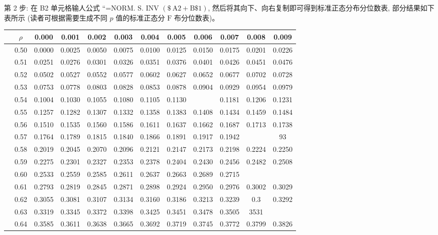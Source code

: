 \documentclass[10pt]{article}
\begin{document}
\begin{CJK*}{UTF8}{bsmi}
第 2 步: 在 B2 单元格输人公式 “=NORM. S. INV $(\$ \mathrm{~A} 2+\mathrm{B} \$ 1)$, 然后将其向下、向右复制即可得到标准正态分布分位数表, 部分结果如下表所示 (读者可根据需要生成不同 $p$ 值的标准正态分 $\mathrm{F}$ 布分位数表)。

\begin{center}
\begin{tabular}{|c|c|c|c|c|c|c|c|c|c|c|c|}
\hline
 & $\rho$ & 0.000 & 0.001 & 0.002 & 0.003 & 0.004 & 0.005 & 0.006 & 0.007 & 0.008 & 0.009 \\
\hline
 & 0.50 & 0.0000 & 0.0025 & 0.0050 & 0.0075 & 0.0100 & 0.0125 & 0.0150 & 0.0175 & 0.0201 & 0.0226 \\
\hline
 & 0.51 & 0.0251 & 0.0276 & 0.0301 & 0.0326 & 0.0351 & 0.0376 & 0.0401 & 0.0426 & 0.0451 & 0.0476 \\
\hline
 & 0.52 & 0.0502 & 0.0527 & 0.0552 & 0.0577 & 0.0602 & 0.0627 & 0.0652 & 0.0677 & 0.0702 & 0.0728 \\
\hline
 & 0.53 & 0.0753 & 0.0778 & 0.0803 & 0.0828 & 0.0853 & 0.0878 & 0.0904 & 0.0929 & 0.0954 & 0.0979 \\
\hline
 & 0.54 & 0.1004 & 0.1030 & 0.1055 & 0.1080 & 0.1105 & 0.1130 &  & 0.1181 & 0.1206 & 0.1231 \\
\hline
 & 0.55 & 0.1257 & 0.1282 & 0.1307 & 0.1332 & 0.1358 & 0.1383 & 0.1408 & 0.1434 & 0.1459 & 0.1484 \\
\hline
 & 0.56 & 0.1510 & 0.1535 & 0.1560 & 0.1586 & 0.1611 & 0.1637 & 0.1662 & 0.1687 & 0.1713 & 0.1738 \\
\hline
 & 0.57 & 0.1764 & 0.1789 & 0.1815 & 0.1840 & 0.1866 & 0.1891 & 0.1917 & 0.1942 &  & 93 \\
\hline
 & 0.58 & 0.2019 & 0.2045 & 0.2070 & 0.2096 & 0.2121 & 0.2147 & 0.2173 & 0.2198 & 0.2224 & 0.2250 \\
\hline
 & 0.59 & 0.2275 & 0.2301 & 0.2327 & 0.2353 & 0.2378 & 0.2404 & 0.2430 & 0.2456 & 0.2482 & 0.2508 \\
\hline
 & 0.60 & 0.2533 & 0.2559 & 0.2585 & 0.2611 & 0.2637 & 0.2663 & 0.2689 & 0.2715 &  &  \\
\hline
 & 0.61 & 0.2793 & 0.2819 & 0.2845 & 0.2871 & 0.2898 & 0.2924 & 0.2950 & 0.2976 & 0.3002 & 0.3029 \\
\hline
 & 0.62 & 0.3055 & 0.3081 & 0.3107 & 0.3134 & 0.3160 & 0.3186 & 0.3213 & 0.3239 & 0.3 & 0.3292 \\
\hline
 & 0.63 & 0.3319 & 0.3345 & 0.3372 & 0.3398 & 0.3425 & 0.3451 & 0.3478 & 0.3505 & 3531 &  \\
\hline
 & 0.64 & 0.3585 & 0.3611 & 0.3638 & 0.3665 & 0.3692 & 0.3719 & 0.3745 & 0.3772 & 0.3799 & 0.3826 \\

\end{tabular}
\end{center}
\end{CJK*}
\end{document}
